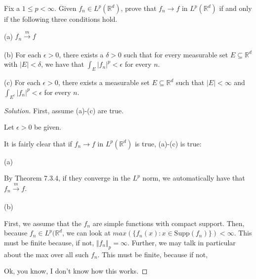 \documentclass[10pt]{article}
\newenvironment{problem}[2][Problem]{\begin{trivlist}
\item[\hskip \labelsep {\bfseries #1}\hskip \labelsep {\bfseries #2.}]}{\end{trivlist}}
\begin{document}
\begin{problem}{7.3.23}

Fix a $1 \leq p < \infty$. Given $f_n \in L^p(\mathbb{R}^d)$, prove that $f_n \to f$ in $L^p(\mathbb{R}^d)$ if and only if the following three conditions hold.

(a) $f_n \xrightarrow[]{m} f$

(b) For each $\epsilon > 0$, there exists a $\delta > 0$ such that for every measurable set $E \subseteq \mathbb{R}^d$ with $|E| < \delta$, we have that $\int_E |f_n|^p < \epsilon$ for every $n$.

(c) For each $\epsilon > 0$, there exists a measurable set $E \subseteq \mathbb{R}^d$ such that $|E| < \infty$ and $ \int_{E^c} |f_n|^p < \epsilon$ for every $n$.

\end{problem}
\begin{proof}[Solution]

First, assume (a)-(c) are true.

Let $\epsilon > 0$ be given.


It is fairly clear that if $f_n \to f$ in $L^p(\mathbb{R}^d)$ is true, (a)-(c) is true:

(a)

By Theorem 7.3.4, if they converge in the $L^p$ norm, we automatically have that $f_n \xrightarrow[]{m} f$.

(b)

First, we assume that the $f_n$ are simple functions with compact support. Then, because $f_n \in L^p(\mathbb{R}^d$, we can look at $max(\{ f_n(x): x \in \text{Supp}(f_n )\}) < \infty$. This must be finite because, if not, $\Vert f_n \Vert_p = \infty$. Further, we may talk in particular about the max over all such $f_n$. This must be finite, because if not,  

Ok, you know, I don't know how this works.

\end{proof}

 
\end{document}
